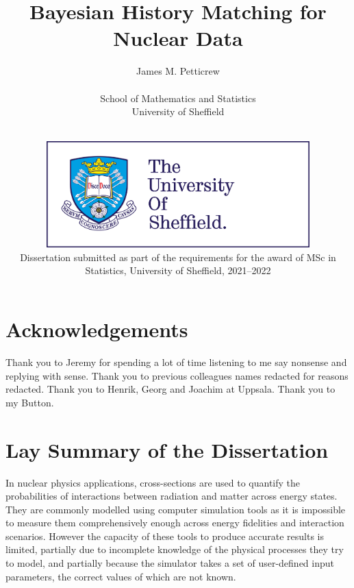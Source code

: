 \documentclass[
  12pt,
  a4paper,
  twoside]{book}
\author{}
\date{\vspace{-2.5em}}
\begin{document}


\title{Bayesian History Matching for Nuclear Data}
\author{James M. Petticrew
\\$~$\vspace{0.5in}\\
School of Mathematics and Statistics\\
University of Sheffield}

\date{$~$\vspace{1.5in}\\
\includegraphics[width=4in]{figures/logo.jpg}\\
\vfill Dissertation submitted as part of the requirements for the award of MSc in Statistics, University of Sheffield, 2021--2022\\
}

\maketitle

\hypertarget{acknowledgements}{%
\chapter*{Acknowledgements}\label{acknowledgements}}

Thank you to Jeremy for spending a lot of time listening to me say nonsense and replying with sense. Thank you to previous colleagues names redacted for reasons redacted. Thank you to Henrik, Georg and Joachim at Uppsala. Thank you to my Button.

\hypertarget{lay-summary-of-the-dissertation}{%
\chapter*{Lay Summary of the Dissertation}\label{lay-summary-of-the-dissertation}}

In nuclear physics applications, cross-sections are used to quantify the probabilities of interactions between radiation and matter across energy states. They are commonly modelled using computer simulation tools as it is impossible to measure them comprehensively enough across energy fidelities and interaction scenarios. However the capacity of these tools to produce accurate results is limited, partially due to incomplete knowledge of the physical processes they try to model, and partially because the simulator takes a set of user-defined input parameters, the correct values of which are not known.
\end{document}

